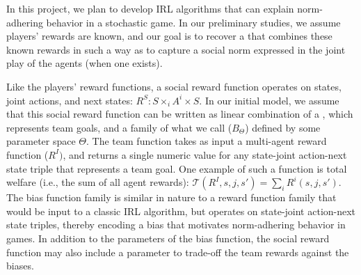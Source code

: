 In this project, we plan to develop IRL algorithms that can explain
norm-adhering behavior in a stochastic game.  In our preliminary
studies, we assume players' rewards are known, and our goal is to
recover a  that combines these known
rewards in such a way as to capture a social norm expressed in the
joint play of the agents (when one exists).


Like the players' reward functions, a social reward function operates
on states, joint actions, and next states: $R^S : S \times_i A^i
\times S$.  In our initial model, we assume that this social reward
function can be written as linear combination of a , which represents team goals,
and a family of what we call  ($B_\Theta$)
defined by some parameter space $\Theta$.  The team function takes as
input a multi-agent reward function ($R^I)$, and returns a single
numeric value for any state-joint action-next state triple that
represents a team goal. One example of such a function is total
welfare (i.e., the sum of all agent rewards): 
${\mathcal T}(R^I, s, j, s') = \sum_i R^i(s, j, s')$.
%
The bias function family is similar in nature to a reward function
family that would be input to a classic IRL algorithm, but operates on
state-joint action-next state triples, thereby encoding a bias that
motivates norm-adhering behavior in games.  In addition to the
parameters of the bias function, the social reward function may also
include a parameter
to trade-off the team rewards against the biases.



